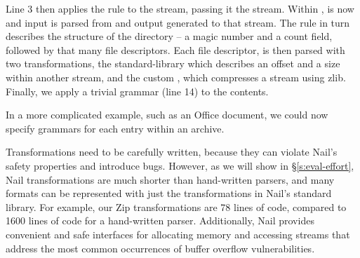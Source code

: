 Line 3 then applies the  rule to  the  stream, passing it the 
stream. Within ,  is now  and input is parsed from and output
generated to that stream. The  rule in turn describes the structure of the directory -- a
magic number and a count field, followed by that many file descriptors. Each file descriptor, is then parsed with two
transformations, the standard-library  which describes an offset and a size within another
stream, and the custom , which compresses a stream using zlib. Finally, we apply a trivial
grammar (line 14) to the contents. 

In a more complicated example, such as an Office document, we could now specify grammars for each
entry within an archive.


 

Transformations need to be carefully written, because they can violate Nail's safety properties
and introduce
bugs. However, as we will show in \S\ref{s:eval-effort}, Nail transformations are much shorter than
hand-written parsers, and many formats can be represented with just the transformations in Nail's
standard library.
For example, our Zip transformations are 78 lines of code, compared to 1600 lines of code for a
   hand-written parser. Additionally, Nail provides convenient and safe interfaces for allocating
   memory and accessing streams that address the most common occurrences of buffer overflow
   vulnerabilities.  


